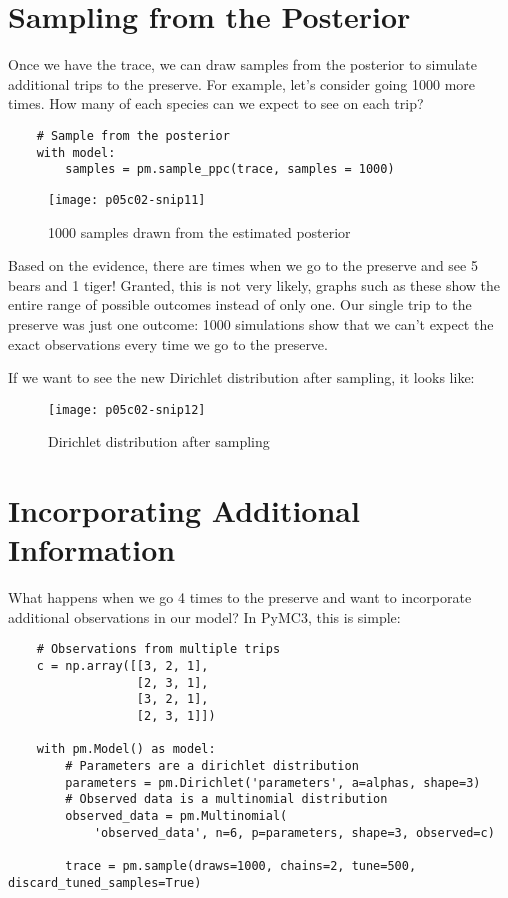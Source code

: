 \section{Sampling from the Posterior}

Once we have the trace, we can draw samples from the posterior to simulate additional trips to the preserve. For example, let's consider going 1000 more times. How many of each species can we expect to see on each trip?



\begin{lstlisting}
    # Sample from the posterior
    with model:
        samples = pm.sample_ppc(trace, samples = 1000)
\end{lstlisting}

\begin{figure*}[h]
    \texttt{[image: p05c02-snip11]}
    \caption{1000 samples drawn from the estimated posterior}
\end{figure*}

Based on the evidence, there are times when we go to the preserve and see 5 bears and 1 tiger! Granted, this is not very likely, graphs such as these show the entire range of possible outcomes instead of only one. Our single trip to the preserve was just one outcome: 1000 simulations show that we can't expect the exact observations every time we go to the preserve.

If we want to see the new Dirichlet distribution after sampling, it looks like:

\begin{figure*}[h]
    \texttt{[image: p05c02-snip12]}
    \caption{Dirichlet distribution after sampling}
\end{figure*}


\section{Incorporating Additional Information}

What happens when we go 4 times to the preserve and want to incorporate additional observations in our model? In PyMC3, this is simple:

\begin{lstlisting}
    # Observations from multiple trips
    c = np.array([[3, 2, 1],
                  [2, 3, 1],
                  [3, 2, 1],
                  [2, 3, 1]])
    
    with pm.Model() as model:
        # Parameters are a dirichlet distribution
        parameters = pm.Dirichlet('parameters', a=alphas, shape=3)
        # Observed data is a multinomial distribution
        observed_data = pm.Multinomial(
            'observed_data', n=6, p=parameters, shape=3, observed=c)    
        
        trace = pm.sample(draws=1000, chains=2, tune=500, discard_tuned_samples=True)
\end{lstlisting}

